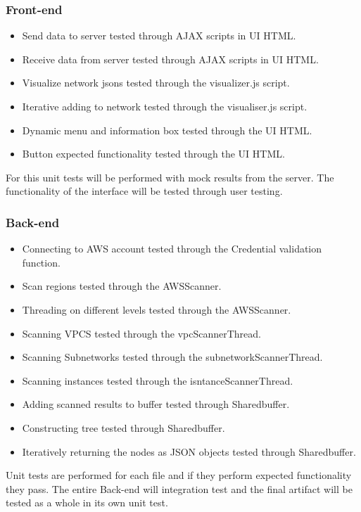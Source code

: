 \documentclass[hidelinks,a4paper,12pt]{article}
\begin{document}
\subsubsection{Front-end}
\begin{itemize}
  \item Send data to server tested through AJAX scripts in UI HTML.
  \item Receive data from server tested through AJAX scripts in UI HTML.
  \item Visualize network jsons tested through the visualizer.js script.
  \item Iterative adding to network tested through the visualiser.js script.
  \item Dynamic menu and information box tested through the UI HTML.
  \item Button expected functionality tested through the UI HTML. 
\end{itemize}
For this unit tests will be performed with mock results from the server. The functionality of the interface will be tested through user testing.

\subsubsection{Back-end}
\begin{itemize}
  \item Connecting to AWS account tested through the Credential validation function.
  \item Scan regions tested through the AWSScanner.
  \item Threading on different levels tested through the AWSScanner.
  \item Scanning VPCS  tested through the vpcScannerThread.
   \item Scanning Subnetworks  tested through the subnetworkScannerThread.
    \item Scanning instances tested through the isntanceScannerThread.
  \item Adding scanned results to buffer tested through Sharedbuffer.
\item Constructing tree tested through Sharedbuffer.
  \item Iteratively returning the nodes as JSON objects tested through Sharedbuffer.
\end{itemize}
Unit tests are performed for each file and if they perform  expected functionality they pass. The entire Back-end will integration test and the final artifact will be tested as a whole in its own unit test.
\end{document}
